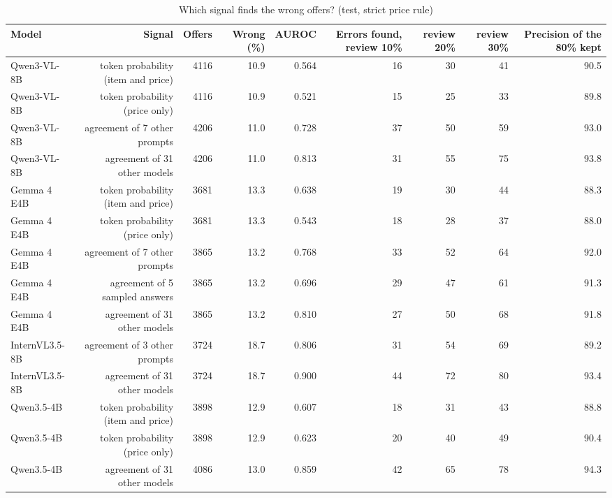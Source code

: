 \begin{table}[t]
\centering
\caption{Which signal finds the wrong offers? (test, strict price rule)}
\label{tab:confidence}
\small
\begin{tabular}{lrrrrrrrr}
\toprule
Model & Signal & Offers & Wrong (\%) & AUROC & Errors found, review 10\% & review 20\% & review 30\% & Precision of the 80\% kept \\
\midrule
Qwen3-VL-8B & token probability (item and price) & 4116 & 10.9 & 0.564 & 16 & 30 & 41 & 90.5 \\
Qwen3-VL-8B & token probability (price only) & 4116 & 10.9 & 0.521 & 15 & 25 & 33 & 89.8 \\
Qwen3-VL-8B & agreement of 7 other prompts & 4206 & 11.0 & 0.728 & 37 & 50 & 59 & 93.0 \\
Qwen3-VL-8B & agreement of 31 other models & 4206 & 11.0 & 0.813 & 31 & 55 & 75 & 93.8 \\
Gemma 4 E4B & token probability (item and price) & 3681 & 13.3 & 0.638 & 19 & 30 & 44 & 88.3 \\
Gemma 4 E4B & token probability (price only) & 3681 & 13.3 & 0.543 & 18 & 28 & 37 & 88.0 \\
Gemma 4 E4B & agreement of 7 other prompts & 3865 & 13.2 & 0.768 & 33 & 52 & 64 & 92.0 \\
Gemma 4 E4B & agreement of 5 sampled answers & 3865 & 13.2 & 0.696 & 29 & 47 & 61 & 91.3 \\
Gemma 4 E4B & agreement of 31 other models & 3865 & 13.2 & 0.810 & 27 & 50 & 68 & 91.8 \\
InternVL3.5-8B & agreement of 3 other prompts & 3724 & 18.7 & 0.806 & 31 & 54 & 69 & 89.2 \\
InternVL3.5-8B & agreement of 31 other models & 3724 & 18.7 & 0.900 & 44 & 72 & 80 & 93.4 \\
Qwen3.5-4B & token probability (item and price) & 3898 & 12.9 & 0.607 & 18 & 31 & 43 & 88.8 \\
Qwen3.5-4B & token probability (price only) & 3898 & 12.9 & 0.623 & 20 & 40 & 49 & 90.4 \\
Qwen3.5-4B & agreement of 31 other models & 4086 & 13.0 & 0.859 & 42 & 65 & 78 & 94.3 \\
\bottomrule
\end{tabular}
\par{}
\end{table}
